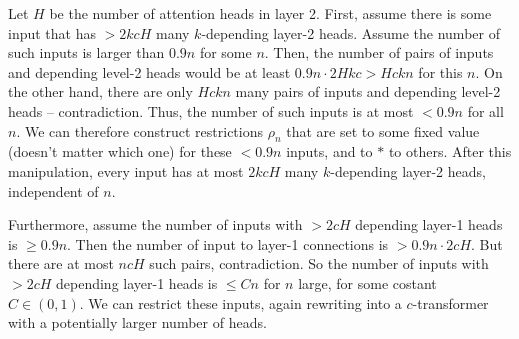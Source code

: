 \documentclass[11pt,a4paper]{article}
\begin{document}
Let $H$ be the number of attention heads in layer 2.
First, assume there is some input that has $>2kcH$ many $k$-depending layer-2 heads.
Assume the number of such inputs is larger than $0.9n$ for some $n$.
Then, the number of pairs of inputs and depending level-2 heads would be at least $0.9 n \cdot 2 H k c > Hckn$ for this $n$.
On the other hand, there are only $Hckn$ many pairs of inputs and depending level-2 heads -- contradiction.
Thus, the number of such inputs is at most $<0.9n$ for all $n$.
We can therefore construct restrictions $\rho_n$ that are set to some fixed value (doesn't matter which one) for these $<0.9n$ inputs, and to $*$ to others.
After this manipulation, every input has at most $2kcH$ many $k$-depending layer-2 heads, independent of $n$. %


Furthermore, assume the number of inputs with $> 2cH$ depending layer-1 heads is $\geq 0.9n$.
Then the number of input to layer-1 connections is $>0.9n \cdot 2cH$.
But there are at most $ncH$ such pairs, contradiction.
So the number of inputs with $> 2cH$ depending layer-1 heads is $\leq Cn$ for $n$ large, for some costant $C \in (0,1)$.
We can restrict these inputs, again rewriting into a $c$-transformer with a potentially larger number of heads.





\end{document}
